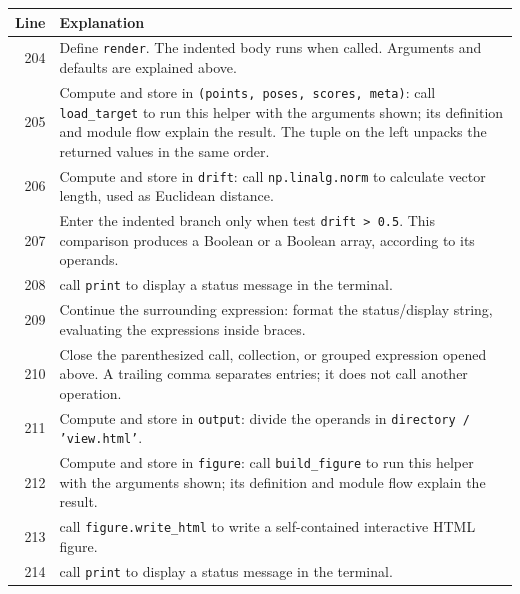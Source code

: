 \documentclass[11pt,a4paper]{book}
\begin{document}
\begin{longtable}{r p{}}

\textbf{Line} & \textbf{Explanation} \\ \hline \endhead

204 & Define \texttt{render}. The indented body runs when called. Arguments and defaults are explained above. \\

205 & Compute and store in \texttt{(points, poses, scores, meta)}: call \texttt{load\_target} to run this helper with the arguments shown; its definition and module flow explain the result. The tuple on the left unpacks the returned values in the same order. \\

206 & Compute and store in \texttt{drift}: call \texttt{np.linalg.norm} to calculate vector length, used as Euclidean distance.  \\

207 & Enter the indented branch only when test \texttt{drift > 0.5}. This comparison produces a Boolean or a Boolean array, according to its operands. \\

208 & call \texttt{print} to display a status message in the terminal. \\

209 & Continue the surrounding expression: format the status/display string, evaluating the expressions inside braces. \\

210 & Close the parenthesized call, collection, or grouped expression opened above. A trailing comma separates entries; it does not call another operation. \\

211 & Compute and store in \texttt{output}: divide the operands in \texttt{directory / 'view.html'}.  \\

212 & Compute and store in \texttt{figure}: call \texttt{build\_figure} to run this helper with the arguments shown; its definition and module flow explain the result.  \\

213 & call \texttt{figure.write\_html} to write a self-contained interactive HTML figure. \\

214 & call \texttt{print} to display a status message in the terminal. \\

\end{longtable}
\end{document}
